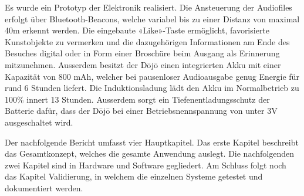 Es wurde ein Prototyp der Elektronik realisiert. Die Ansteuerung der Audiofiles erfolgt über Bluetooth-Beacons, welche variabel bis zu einer Distanz von maximal 40m erkennt werden. Die eingebaute «Like»-Taste ermöglicht, favorisierte Kunstobjekte zu vermerken und die dazugehörigen Informationen am Ende des Besuches digital oder in Form einer Broschüre beim Ausgang als Erinnerung mitzunehmen. Ausserdem besitzt der Dōjō einen integrierten Akku mit einer Kapazität von 800 mAh, welcher bei pausenloser Audioausgabe genug Energie für rund 6 Stunden liefert. Die Induktionsladung lädt den Akku im Normalbetrieb zu 100\% innert 13 Stunden. Ausserdem sorgt ein Tiefenentladungsschutz der Batterie dafür, dass der Dōjō bei einer Betriebsnennspannung von unter 3V ausgeschaltet wird.
 
Der nachfolgende Bericht umfasst vier Hauptkapitel. Das erste Kapitel beschreibt das Gesamtkonzept, welches die gesamte Anwendung auslegt. Die nachfolgenden zwei Kapitel sind in Hardware und Software gegliedert. Am Schluss folgt noch das Kapitel Validierung, in welchem die einzelnen Systeme getestet und dokumentiert werden.
